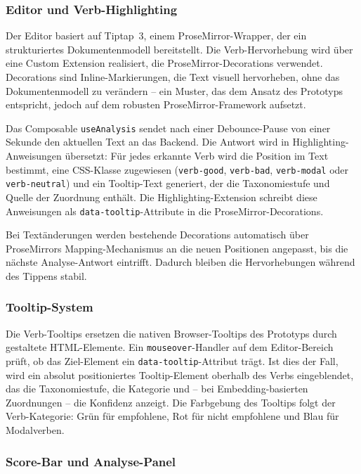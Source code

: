 \subsubsection{Editor und Verb-Highlighting}\label{sec:impl-editor}

Der Editor basiert auf Tiptap~3, einem ProseMirror-Wrapper, der ein strukturiertes Dokumentenmodell bereitstellt.
Die Verb-Hervorhebung wird über eine Custom Extension realisiert, die ProseMirror-Decorations verwendet.
Decorations sind Inline-Markierungen, die Text visuell hervorheben, ohne das Dokumentenmodell zu verändern -- ein Muster, das dem Ansatz des Prototyps entspricht, jedoch auf dem robusten ProseMirror-Framework aufsetzt.

Das Composable \texttt{useAnalysis} sendet nach einer Debounce-Pause von einer Sekunde den aktuellen Text an das Backend.
Die Antwort wird in Highlighting-Anweisungen übersetzt: Für jedes erkannte Verb wird die Position im Text bestimmt, eine CSS-Klasse zugewiesen (\texttt{verb-good}, \texttt{verb-bad}, \texttt{verb-modal} oder \texttt{verb-neutral}) und ein Tooltip-Text generiert, der die Taxonomiestufe und Quelle der Zuordnung enthält.
Die Highlighting-Extension schreibt diese Anweisungen als \texttt{data-tooltip}-Attribute in die ProseMirror-Decorations.

Bei Textänderungen werden bestehende Decorations automatisch über ProseMirrors Mapping-Mechanismus an die neuen Positionen angepasst, bis die nächste Analyse-Antwort eintrifft.
Dadurch bleiben die Hervorhebungen während des Tippens stabil.

\subsubsection{Tooltip-System}\label{sec:impl-tooltips}

Die Verb-Tooltips ersetzen die nativen Browser-Tooltips des Prototyps durch gestaltete HTML-Elemente.
Ein \texttt{mouseover}-Handler auf dem Editor-Bereich prüft, ob das Ziel-Element ein \texttt{data-tooltip}-Attribut trägt.
Ist dies der Fall, wird ein absolut positioniertes Tooltip-Element oberhalb des Verbs eingeblendet, das die Taxonomiestufe, die Kategorie und -- bei Embedding-basierten Zuordnungen -- die Konfidenz anzeigt.
Die Farbgebung des Tooltips folgt der Verb-Kategorie: Grün für empfohlene, Rot für nicht empfohlene und Blau für Modalverben.

\subsubsection{Score-Bar und Analyse-Panel}\label{sec:impl-scorebar}

